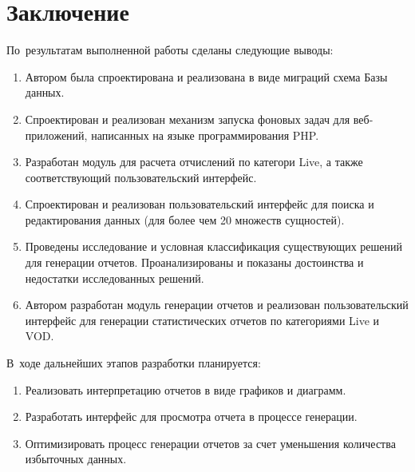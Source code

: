 \section*{Заключение}

По~результатам выполненной работы сделаны следующие выводы:

\begin{enumerate}
\item {
Автором была спроектирована и реализована в виде миграций схема
Базы данных.
}
\item {
Спроектирован и реализован механизм запуска фоновых задач для веб-приложений, написанных
на языке программирования PHP.
}
\item {
Разработан модуль для расчета отчислений по категори Live, а также соответствующий
пользовательский интерфейс. 
}
\item {
Спроектирован и реализован пользовательский интерфейс для поиска
и редактирования данных (для более чем 20 множеств сущностей).
}
\item {
Проведены исследование и условная классификация существующих 
решений для генерации отчетов. 
Проанализированы и показаны достоинства и недостатки исследованных решений.
}
\item {
Автором разработан модуль генерации отчетов и реализован
пользовательский интерфейс для генерации статистических отчетов
по категориями Live и VOD.
}
\end{enumerate}

В~ходе дальнейших этапов разработки планируется:
\begin{enumerate}
\item {
Реализовать интерпретацию отчетов в виде графиков и диаграмм.
}
\item {
Разработать интерфейс для просмотра отчета в процессе генерации.
}
\item {
Оптимизировать процесс генерации отчетов за счет уменьшения количества избыточных данных.
}
\end{enumerate}
